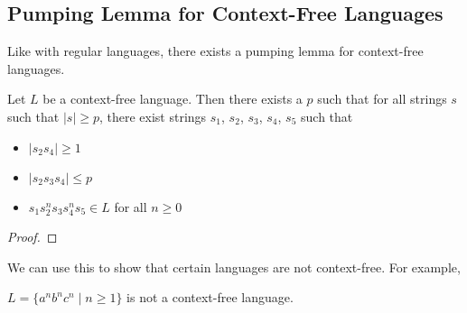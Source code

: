 \subsection{Pumping Lemma for Context-Free Languages}\label{pumping-lemma-for-context-free-languages}

Like with regular languages, there exists a pumping lemma for context-free languages. 

\begin{theorem}
    Let \(L\) be a context-free language. Then there exists a \(p\) such that for all strings \(s\) such that \(|s|\geq p\), there exist strings \(s_1\), \(s_2\), \(s_3\), \(s_4\), \(s_5\) such that 
    \begin{itemize}
        \item \(|s_2 s_4|\geq 1\)
        \item \(|s_2 s_3 s_4|\leq p\)
        \item \(s_1 s_2^n s_3 s_4^n s_5\in L\) for all \(n\geq0\)
  \end{itemize}
\end{theorem}

\begin{proof}

\end{proof}

We can use this to show that certain languages are not context-free. For example, 

\begin{theorem}
    \(L=\{a^n b^n c^n\mid n\geq1\} \) is not a context-free language.
\end{theorem}

